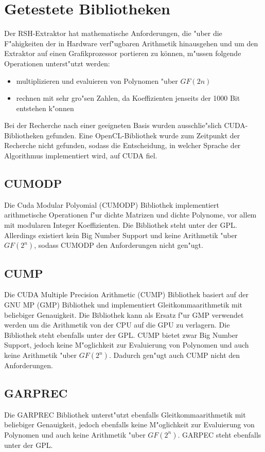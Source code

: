 \section{Getestete Bibliotheken}
\label{Bibliotheken}

Der RSH-Extraktor hat mathematische Anforderungen, die "uber die F"ahigkeiten der in Hardware verf"ugbaren Arithmetik hinausgehen und um den Extraktor auf einen Grafikprozessor portieren zu können, m"ussen folgende Operationen unterst"utzt werden:
\begin{itemize}
	\item multiplizieren und evaluieren von Polynomen "uber $GF(2n)$
	\item rechnen mit sehr gro"sen Zahlen, da Koeffizienten jenseits der 1000 Bit entstehen k"onnen
\end{itemize}

Bei der Recherche nach einer geeigneten Basis wurden ausschlie"slich CUDA-Bibliotheken gefunden. Eine OpenCL-Bibliothek wurde zum Zeitpunkt der Recherche nicht gefunden, sodass die Entscheidung, in welcher Sprache der Algorithmus implementiert wird, auf CUDA fiel.

\subsection{CUMODP}
Die Cuda Modular Polyomial (CUMODP) Bibliothek implementiert arithmetische Operationen f"ur dichte Matrizen und dichte Polynome, vor allem mit modularen Integer Koeffizienten. Die Bibliothek steht unter der GPL.
Allerdings existiert kein Big Number Support und keine Arithmetik "uber $GF(2^n)$, sodass CUMODP den Anforderungen nicht gen"ugt.

\subsection{CUMP}
Die CUDA Multiple Precision Arithmetic (CUMP) Bibliothek basiert auf der GNU MP (GMP) Bibliothek und implementiert Gleitkommaarithmetik mit beliebiger Genauigkeit. Die Bibliothek kann als Ersatz f"ur GMP verwendet werden um die Arithmetik von der CPU auf die GPU zu verlagern. Die Bibliothek steht ebenfalls unter der GPL.
CUMP bietet zwar Big Number Support, jedoch keine M"oglichkeit zur Evaluierung von Polynomen und auch keine Arithmetik "uber $GF(2^n)$. Dadurch gen"ugt auch CUMP nicht den Anforderungen.

\subsection{GARPREC}
Die GARPREC Bibliothek unterst"utzt ebenfalls Gleitkommaarithmetik mit beliebiger Genauigkeit, jedoch ebenfalls keine M"oglichkeit zur Evaluierung von Polynomen und auch keine Arithmetik "uber $GF(2^n)$.
GARPEC steht ebenfalls unter der GPL.


